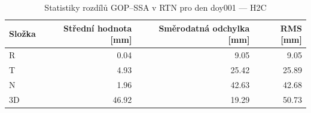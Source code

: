 \begin{table}[H]
\centering
\caption{Statistiky rozdílů GOP–SSA v RTN pro den doy001 — H2C}
\label{tab:gop_vs_ssa_h2c_doy001_day_stats}
\begin{tabular}{lrrr}
\toprule
Složka & Střední hodnota [mm] & Směrodatná odchylka [mm] & RMS [mm] \\
\midrule
R & 0.04 & 9.05 & 9.05 \\
T & 4.93 & 25.42 & 25.89 \\
N & 1.96 & 42.63 & 42.68 \\
3D & 46.92 & 19.29 & 50.73 \\
\bottomrule
\end{tabular}
\end{table}

